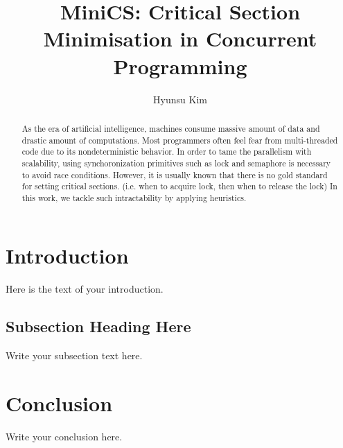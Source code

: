 \documentclass[sigchi]{acmart}
\begin{document}
\title{MiniCS: Critical Section Minimisation in Concurrent Programming}
\author{Hyunsu Kim}

\maketitle

\begin{abstract}
As the era of artificial intelligence, machines consume massive amount of data and drastic amount of computations. Most programmers often feel fear from multi-threaded code due to its nondeterministic behavior. In order to tame the parallelism with scalability, using synchoronization primitives such as lock and semaphore is necessary to avoid race conditions. However, it is usually known that there is no gold standard for setting critical sections. (i.e. when to acquire lock, then when to release the lock) In this work, we tackle such intractability by applying heuristics.
\end{abstract}

\section{Introduction}
Here is the text of your introduction.

\subsection{Subsection Heading Here}
Write your subsection text here.

\section{Conclusion}
Write your conclusion here.
\end{document}
